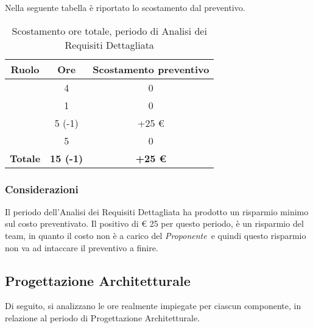 Nella seguente tabella è riportato lo scostamento dal preventivo.

\begin{table}[H]
	\begin{center}
		\begin{tabular}{|c|c|c|}
			\hline
			\textbf{Ruolo}	& \textbf{Ore}	& \textbf{Scostamento preventivo} \\
			\hline
			\Res	&   4 	&  0  \\
			\hline
			\Amm	&   1	&  0	\\
			\hline
			\Ana	&   5 (-1)	&  +25 €	\\
			\hline
			\Ver	&   5	&  0	\\
			\hline
			\textbf{Totale} & \textbf{15 (-1)} & \textbf{+25 €}\\
			\hline
		\end{tabular}
	\end{center}
	\caption{Scostamento ore totale, periodo di Analisi dei Requisiti Dettagliata}
\end{table}

\subsubsection{Considerazioni}
Il periodo dell'Analisi dei Requisiti Dettagliata ha prodotto un risparmio minimo sul costo preventivato. Il positivo di € 25 per questo periodo, è un risparmio del team, in quanto il costo non è a carico del \textit{Proponente}\ e quindi questo risparmio non va ad intaccare il preventivo a finire.


\subsection{Progettazione Architetturale}

Di seguito, si analizzano le ore realmente impiegate per ciascun componente, in relazione al periodo di Progettazione Architetturale.

